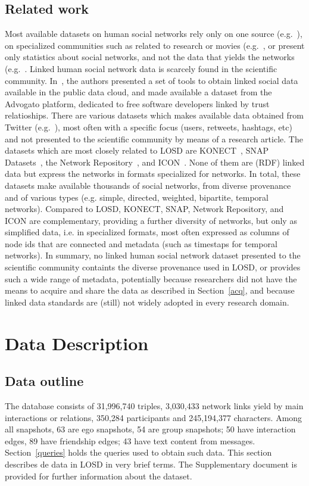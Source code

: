 \documentclass[data,datadescriptor,submit,moreauthors,pdftex]{Definitions/mdpi}
\begin{document}
\subsection{Related work}\label{srel}
Most available datasets on human social networks rely only on one source (e.g.~\cite{nat,fb1}),
on specialized communities such as related to research or movies (e.g.~\cite{s1},
or present only statistics about social networks, and not the data that yields the networks (e.g.~\cite{st1}.
Linked human social network data is scarcely found in the scientific community.
In~\cite{foaf1}, the authors presented a set of tools to obtain linked social data available in the public data cloud, and made available a dataset from the Advogato platform,
dedicated to free software developers linked by trust relatioships.
There are various datasets which makes available data obtained from Twitter (e.g.~\cite{tw1,tw2}),
most often with a specific focus (users, retweets, hashtags, etc)
and not presented to the scientific community by means of a research article.
The datasets which are most closely related to LOSD are KONECT~\cite{konect},
SNAP Datasets~\cite{snapnets}, the Network Repository~\cite{nr}, and ICON~\cite{icon}.
None of them are (RDF) linked data but express the networks in formats specialized for networks.
In total, these datasets make available thousands of social networks, from diverse provenance and of various types (e.g. simple, directed, weighted, bipartite, temporal networks).
Compared to LOSD, KONECT, SNAP, Network Repository, and ICON are complementary, providing a further diversity of networks, but only as simplified data, i.e. in specialized formats, most often expressed as columns of node ids that are connected and metadata (such as timestaps for temporal networks).
In summary, no linked human social network dataset presented to the
scientific community containts the diverse provenance used in LOSD,
or provides such a wide range of metadata,
potentially because researchers did not have the means to acquire and
share the data as described in Section~\ref{acq},
and because linked data standards are (still) not widely adopted in 
every research domain.

\section{Data Description}\label{materials}
\subsection{Data outline}\label{outline}
The database consists of 31,996,740 triples, 3,030,433 network links yield by main interactions or relations, 350,284 participants and 245,194,377 characters. Among all snapshots, 63 are ego snapshots, 54 are group snapshots; 50 have interaction edges, 89 have friendship edges; 43 have text content from messages.
Section~\ref{queries} holds the queries used to obtain such data.
This section describes de data in LOSD in very brief terms.
The Supplementary document is provided for further information about the dataset.
\end{document}
